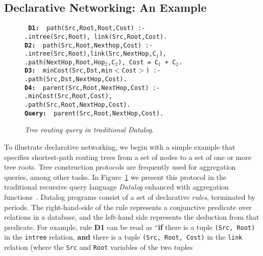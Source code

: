 \documentclass{vldb}
\newcommand{\datalogspace}{\textcolor[gray]{1}{.}\hspace{0.5in}}
\begin{document}
\subsection{Declarative Networking: An Example}
\begin{figure}[h]
\begin{boxedminipage}{3.5in}
\footnotesize{\tt
{\bf D1: } path(Src,Root,Root,Cost) :- \\
\datalogspace intree(Src,Root), link(Src,Root,Cost). \\
{\bf D2: } path(Src,Root,Nexthop,Cost) :- \\
\datalogspace intree(Src,Root),link(Src,NextHop,C$_{1}$),\\
\datalogspace path(NextHop,Root,Hop$_{2}$,C$_{2}$), Cost = C$_{1}$ + C$_{2}$.\\
{\bf D3: } minCost(Src,Dst,min$<$Cost$>$) :- \\
\datalogspace path(Src,Dst,NextHop,Cost).\\
{\bf D4: } parent(Src,Root,NextHop,Cost) :- \\
\datalogspace minCost(Src,Root,Cost), \\
\datalogspace path(Src,Root,NextHop,Cost).\\
{\bf Query: } parent(Src,Root,NextHop,Cost).
}
\vspace{-1em}
\small{\caption{\emph{\small Tree routing
      query in traditional Datalog}.}}
\end{boxedminipage}
\label{fig:dneg}
\end{figure}
To illustrate declarative networking, we begin with a simple example
that specifies shortest-path routing trees from a set of nodes to a
set of one or more tree roots. Tree construction protocols are
frequently used for aggregation queries, among other tasks.  In
Figure~\ref{fig:dneg} we present this protocol in the traditional
recursive query language {\em Datalog} enhanced with aggregation
functions~\cite{greco99}.  Datalog programs consist of a set of
declarative {\em rules}, terminated by periods.  The right-hand-side
of the rule represents a conjunctive predicate over relations in a
database, and the left-hand side represents the deduction from that
predicate.  For example, rule {\bf D1} can be read as ``{\bf if} there
is a tuple {\tt (Src, Root)} in the {\tt intree} relation, {\bf and}
there is a tuple {\tt (Src, Root, Cost)} in the {\tt link} relation
(where the {\tt Src} and {\tt Root} variables of the two tuples
\end{document}
